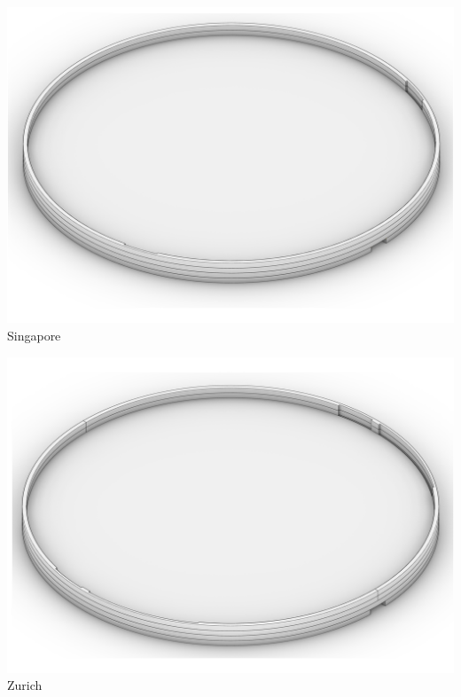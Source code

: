 \documentclass[a4paper,9pt]{article}
\begin{document}
  \begin{minipage}{0.48\linewidth}
        \centering
        \includegraphics[width=.95\linewidth]{Images/base SG.png}
       \\{Singapore}
         \label{base sg}
    \end{minipage}
    \hfill
    \begin{minipage}{0.48\linewidth}
         \centering
        \includegraphics[width=.95\linewidth]{Images/base ZH.png}
       \\{Zurich}
        \label{base zh}
    \end{minipage}
    \label{base}
\vspace{1cm}
\end{document}

